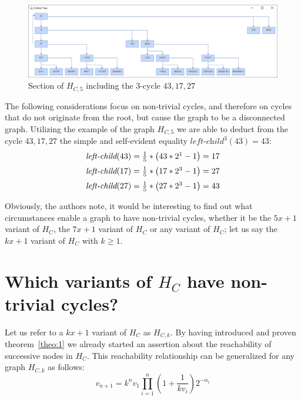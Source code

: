 \begin{figure}
	\includegraphics[width=1.00\textwidth]{figures/h_c5a.png}
	\caption{Section of $H_{C,5}$ including the $3$-cycle $43,17,27$}
	\label{fig:5}
\end{figure}

\par\medskip
The following considerations focus on non-trivial cycles, and therefore on cycles that do not originate from the root, but cause the graph to be a disconnected graph. Utilizing the example of the graph $H_{C,5}$ we are able to deduct from the cycle $43,17,27$ the simple and self-evident equality $\textit{left-child}^3(43)=43$:
\begin{equation*}
\begin{array}{l}
\textit{left-child}(43)=\frac{1}{5}*\left(43*2^1-1\right)=17
\\[\medskipamount]
\textit{left-child}(17)=\frac{1}{5}*\left(17*2^3-1\right)=27
\\[\medskipamount]
\textit{left-child}(27)=\frac{1}{5}*\left(27*2^3-1\right)=43
\end{array}
\end{equation*}

Obviously, the authors note, it would be interesting to find out what circumstances enable a graph to have non-trivial cycles, whether it be the $5x+1$ variant of $H_C$, the $7x+1$ variant of $H_C$ or any variant of $H_C$; let us say the $kx+1$ variant of $H_C$ with $k\geq 1$.

\section{Which variants of \mbox{$H_C$} have non-trivial cycles?}
\label{sec:non_trivial_cycles}
Let us refer to a $kx+1$ variant of $H_C$ as $H_{C,k}$. By having introduced and proven theorem~\ref{theo:1} we already started an assertion about the reachability of successive nodes in $H_C$. This reachability relationship can be generalized for any graph $H_{C,k}$ as follows:
\begin{equation}
\label{eq:generalized_reachability}
v_{n+1}=k^nv_1\prod_{i=1}^{n}\left(1+\frac{1}{kv_{i}}\right)2^{-\alpha_i}
\end{equation}

